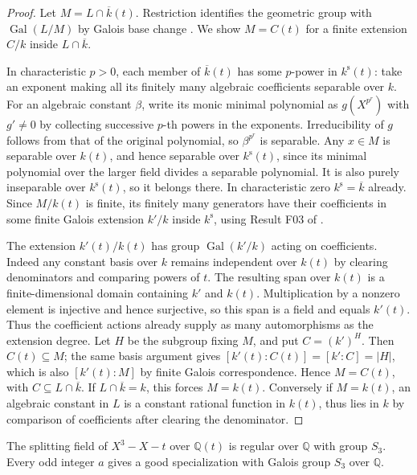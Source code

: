 \begin{proof}
Let \(M=L\cap\overline k(t)\). Restriction identifies the geometric
group with \(\operatorname{Gal}(L/M)\) by Galois base change
\cite[Result C10]{mg-aft}. We show \(M=C(t)\) for a finite
extension \(C/k\) inside \(L\cap\overline k\).

In characteristic \(p>0\), each member of \(\overline k(t)\)
has some \(p\)-power in \(k^{\mathrm{s}}(t)\): take an exponent
making all its finitely many algebraic coefficients separable over
\(k\). For an algebraic constant \(\beta\), write its monic minimal
polynomial as \(g(X^{p^r})\) with \(g'\ne0\) by collecting successive
\(p\)-th powers in the exponents. Irreducibility of \(g\) follows
from that of the original polynomial, so \(\beta^{p^r}\) is
separable. Any \(x\in M\) is separable over \(k(t)\), and hence
separable over \(k^{\mathrm{s}}(t)\), since its minimal polynomial
over the larger field divides a separable polynomial. It is also
purely inseparable over \(k^{\mathrm{s}}(t)\), so it belongs there.
In characteristic zero \(k^{\mathrm{s}}=\overline k\) already.
Since \(M/k(t)\) is finite, its finitely many generators have
their coefficients in some finite Galois extension \(k'/k\)
inside \(k^{\mathrm{s}}\), using Result F03 of
\cite{mg-aft}.

The extension \(k'(t)/k(t)\) has group \(\operatorname{Gal}(k'/k)\)
acting on coefficients. Indeed any constant basis over \(k\)
remains independent over \(k(t)\) by clearing denominators and
comparing powers of \(t\). The resulting span over \(k(t)\)
is a finite-dimensional domain containing \(k'\) and \(k(t)\).
Multiplication by a nonzero element is injective and hence
surjective, so this span is a field and equals \(k'(t)\).
Thus the coefficient actions already supply as many automorphisms
as the extension degree. Let \(H\) be the subgroup fixing \(M\),
and put \(C=(k')^H\). Then \(C(t)\subseteq M\); the same
basis argument gives \([k'(t):C(t)]=[k':C]=|H|\), which is
also \([k'(t):M]\) by finite Galois correspondence. Hence
\(M=C(t)\), with \(C\subseteq L\cap\overline k\).
If \(L\cap\overline k=k\), this forces \(M=k(t)\).
Conversely if \(M=k(t)\), an algebraic constant in \(L\) is
a constant rational function in \(k(t)\), thus lies in \(k\)
by comparison of coefficients after clearing the denominator.
\end{proof}

\begin{theorem}
\label{res:IG13}
The splitting field of \(X^3-X-t\) over \(\mathbb Q(t)\)
is regular over \(\mathbb Q\) with group \(S_3\).
Every odd integer \(a\) gives a good specialization with
Galois group \(S_3\) over \(\mathbb Q\).
\end{theorem}

